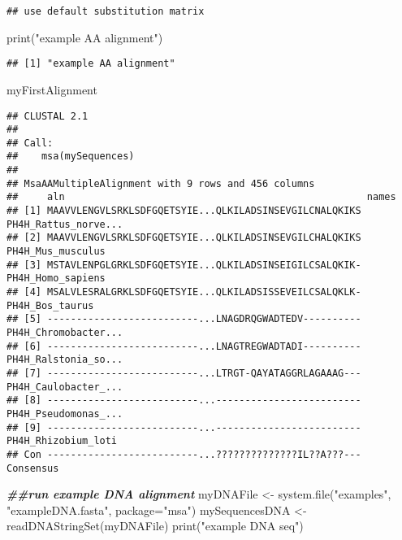 \documentclass[
]{article}
\newenvironment{Shaded}{\begin{snugshade}}{\end{snugshade}}
\newcommand{\AttributeTok}[1]{\textcolor[rgb]{0.77,0.63,0.00}{#1}}
\newcommand{\DocumentationTok}[1]{\textcolor[rgb]{0.56,0.35,0.01}{\textbf{\textit{#1}}}}
\newcommand{\FunctionTok}[1]{\textcolor[rgb]{0.00,0.00,0.00}{#1}}
\newcommand{\NormalTok}[1]{#1}
\newcommand{\OtherTok}[1]{\textcolor[rgb]{0.56,0.35,0.01}{#1}}
\newcommand{\StringTok}[1]{\textcolor[rgb]{0.31,0.60,0.02}{#1}}
\begin{document}
\begin{verbatim}
## use default substitution matrix
\end{verbatim}

\begin{Shaded}
\begin{Highlighting}[]
\FunctionTok{print}\NormalTok{(}\StringTok{"example AA alignment"}\NormalTok{)}
\end{Highlighting}
\end{Shaded}

\begin{verbatim}
## [1] "example AA alignment"
\end{verbatim}

\begin{Shaded}
\begin{Highlighting}[]
\NormalTok{myFirstAlignment}
\end{Highlighting}
\end{Shaded}

\begin{verbatim}
## CLUSTAL 2.1  
## 
## Call:
##    msa(mySequences)
## 
## MsaAAMultipleAlignment with 9 rows and 456 columns
##     aln                                                    names
## [1] MAAVVLENGVLSRKLSDFGQETSYIE...QLKILADSINSEVGILCNALQKIKS PH4H_Rattus_norve...
## [2] MAAVVLENGVLSRKLSDFGQETSYIE...QLKILADSINSEVGILCHALQKIKS PH4H_Mus_musculus
## [3] MSTAVLENPGLGRKLSDFGQETSYIE...QLKILADSINSEIGILCSALQKIK- PH4H_Homo_sapiens
## [4] MSALVLESRALGRKLSDFGQETSYIE...QLKILADSISSEVEILCSALQKLK- PH4H_Bos_taurus
## [5] --------------------------...LNAGDRQGWADTEDV---------- PH4H_Chromobacter...
## [6] --------------------------...LNAGTREGWADTADI---------- PH4H_Ralstonia_so...
## [7] --------------------------...LTRGT-QAYATAGGRLAGAAAG--- PH4H_Caulobacter_...
## [8] --------------------------...------------------------- PH4H_Pseudomonas_...
## [9] --------------------------...------------------------- PH4H_Rhizobium_loti
## Con --------------------------...??????????????IL??A???--- Consensus
\end{verbatim}

\begin{Shaded}
\begin{Highlighting}[]
\DocumentationTok{\#\#run example DNA alignment}
\NormalTok{myDNAFile }\OtherTok{\textless{}{-}} \FunctionTok{system.file}\NormalTok{(}\StringTok{"examples"}\NormalTok{, }\StringTok{"exampleDNA.fasta"}\NormalTok{, }\AttributeTok{package=}\StringTok{"msa"}\NormalTok{)}
\NormalTok{mySequencesDNA }\OtherTok{\textless{}{-}} \FunctionTok{readDNAStringSet}\NormalTok{(myDNAFile)}
\FunctionTok{print}\NormalTok{(}\StringTok{"example DNA seq"}\NormalTok{)}
\end{Highlighting}
\end{Shaded}
\end{document}
